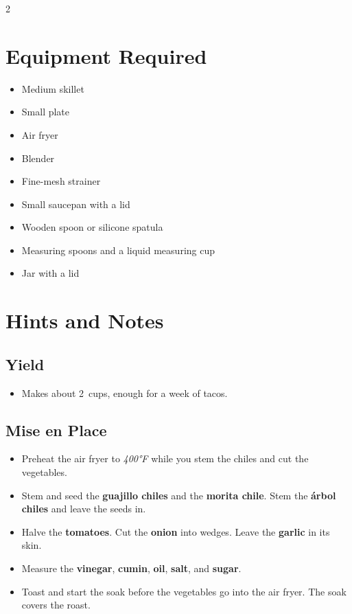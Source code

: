 \documentclass[11pt,letterpaper]{article}
\begin{document}
{\footnotesize
\setlength{\columnsep}{20pt}
\setlength{\multicolsep}{6pt}
\begin{multicols}{2}
\setlength{\parindent}{0pt}
\setlength{\parskip}{2pt}
\setlength{\itemsep}{0pt}
\setlength{\parsep}{0pt}

\section*{Equipment Required}
\begin{itemize}
    \item Medium skillet
    \item Small plate
    \item Air fryer
    \item Blender
    \item Fine-mesh strainer
    \item Small saucepan with a lid
    \item Wooden spoon or silicone spatula
    \item Measuring spoons and a liquid measuring cup
    \item Jar with a lid
\end{itemize}

\section*{Hints and Notes}

\subsection*{Yield}
\begin{itemize}
    \item Makes about 2~cups, enough for a week of tacos.
\end{itemize}

\subsection*{Mise en Place}
\begin{itemize}
    \item Preheat the air fryer to \textit{400°F} while you stem the chiles and cut the vegetables.
    \item Stem and seed the \textbf{guajillo chiles} and the \textbf{morita chile}. Stem the \textbf{árbol chiles} and leave the seeds in.
    \item Halve the \textbf{tomatoes}. Cut the \textbf{onion} into wedges. Leave the \textbf{garlic} in its skin.
    \item Measure the \textbf{vinegar}, \textbf{cumin}, \textbf{oil}, \textbf{salt}, and \textbf{sugar}.
    \item Toast and start the soak before the vegetables go into the air fryer. The soak covers the roast.
\end{itemize}


\end{multicols}}
\end{document}
